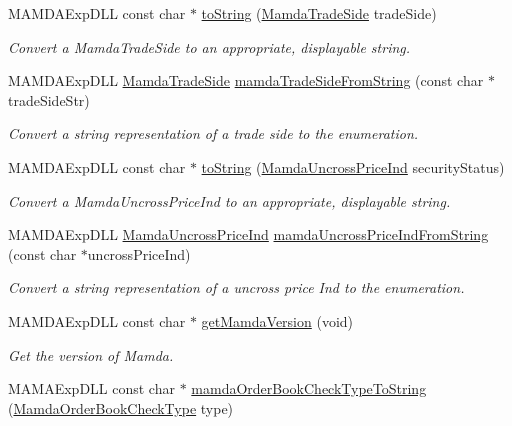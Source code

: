 \begin{CompactItemize}
MAMDAExp\-DLL const char $\ast$ \hyperlink{namespaceWombat_59c8440eb9763aa40fe4377387c3ce8d}{to\-String} (\hyperlink{namespaceWombat_e22aa41efabe0fe38b2d72577790ad3e}{Mamda\-Trade\-Side} trade\-Side)
\begin{CompactList}\small\item\em Convert a Mamda\-Trade\-Side to an appropriate, displayable string. \item\end{CompactList}\item 
MAMDAExp\-DLL \hyperlink{namespaceWombat_e22aa41efabe0fe38b2d72577790ad3e}{Mamda\-Trade\-Side} \hyperlink{namespaceWombat_043afc291514ada0e9193f26bd8c89f2}{mamda\-Trade\-Side\-From\-String} (const char $\ast$trade\-Side\-Str)
\begin{CompactList}\small\item\em Convert a string representation of a trade side to the enumeration. \item\end{CompactList}\item 
MAMDAExp\-DLL const char $\ast$ \hyperlink{namespaceWombat_bc5a101298a4f5b1d0ede524fd2bf142}{to\-String} (\hyperlink{namespaceWombat_4f0ec767cbe150ee160f65e719e76226}{Mamda\-Uncross\-Price\-Ind} security\-Status)
\begin{CompactList}\small\item\em Convert a Mamda\-Uncross\-Price\-Ind to an appropriate, displayable string. \item\end{CompactList}\item 
MAMDAExp\-DLL \hyperlink{namespaceWombat_4f0ec767cbe150ee160f65e719e76226}{Mamda\-Uncross\-Price\-Ind} \hyperlink{namespaceWombat_238c25b0feeb411e0536614c3a0b3a1f}{mamda\-Uncross\-Price\-Ind\-From\-String} (const char $\ast$uncross\-Price\-Ind)
\begin{CompactList}\small\item\em Convert a string representation of a uncross price Ind to the enumeration. \item\end{CompactList}\item 
MAMDAExp\-DLL const char $\ast$ \hyperlink{namespaceWombat_85df7924b251ca3abfd56daf6e6973f5}{get\-Mamda\-Version} (void)
\begin{CompactList}\small\item\em Get the version of Mamda. \item\end{CompactList}\item 
MAMAExp\-DLL const char $\ast$ \hyperlink{namespaceWombat_441a98871ef122eac7809d75d9e054fd}{mamda\-Order\-Book\-Check\-Type\-To\-String} (\hyperlink{namespaceWombat_6f15e7af875f3469c5fb0afe58b21667}{Mamda\-Order\-Book\-Check\-Type} type)
\end{CompactItemize}


